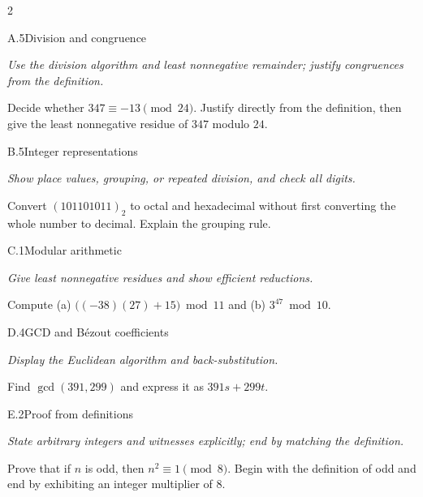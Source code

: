 \documentclass[9pt]{extarticle}
\begin{document}
\begin{multicols}{2}
\begin{CoreProblem}{A.5}{Division and congruence}
{\scriptsize\textit{Use the division algorithm and least nonnegative remainder; justify congruences from the definition.}\par}
Decide whether $347\equiv-13\pmod{24}$. Justify directly from the definition,
then give the least nonnegative residue of $347$ modulo $24$.
\end{CoreProblem}
\begin{CoreProblem}{B.5}{Integer representations}
{\scriptsize\textit{Show place values, grouping, or repeated division, and check all digits.}\par}
Convert $(101101011)_2$ to octal and hexadecimal without first converting the
whole number to decimal. Explain the grouping rule.
\end{CoreProblem}
\begin{CoreProblem}{C.1}{Modular arithmetic}
{\scriptsize\textit{Give least nonnegative residues and show efficient reductions.}\par}
Compute (a) $\bigl((-38)(27)+15\bigr)\bmod11$ and
(b) $3^{47}\bmod10$.
\end{CoreProblem}
\columnbreak
\begin{CoreProblem}{D.4}{GCD and B\'ezout coefficients}
{\scriptsize\textit{Display the Euclidean algorithm and back-substitution.}\par}
Find $\gcd(391,299)$ and express it as $391s+299t$.
\end{CoreProblem}
\begin{CoreProblem}{E.2}{Proof from definitions}
{\scriptsize\textit{State arbitrary integers and witnesses explicitly; end by matching the definition.}\par}
Prove that if $n$ is odd, then $n^2\equiv1\pmod{8}$. Begin with the definition
of odd and end by exhibiting an integer multiplier of $8$.
\end{CoreProblem}
\end{multicols}
\CoreWorkArea
\FormBreak
{}
\end{document}
